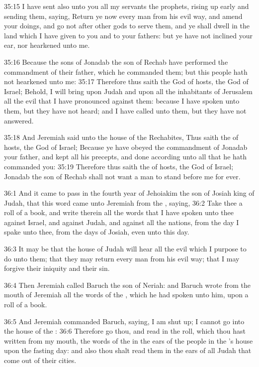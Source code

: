 35:15 I have sent also unto you all my servants the prophets, rising up early and sending them, saying, Return ye now every man from his evil way, and amend your doings, and go not after other gods to serve them, and ye shall dwell in the land which I have given to you and to your fathers: but ye have not inclined your ear, nor hearkened unto me.

35:16 Because the sons of Jonadab the son of Rechab have performed the commandment of their father, which he commanded them; but this people hath not hearkened unto me: 35:17 Therefore thus saith the \LORD God of hosts, the God of Israel; Behold, I will bring upon Judah and upon all the inhabitants of Jerusalem all the evil that I have pronounced against them: because I have spoken unto them, but they have not heard; and I have called unto them, but they have not answered.

35:18 And Jeremiah said unto the house of the Rechabites, Thus saith the \LORD of hosts, the God of Israel; Because ye have obeyed the commandment of Jonadab your father, and kept all his precepts, and done according unto all that he hath commanded you: 35:19 Therefore thus saith the \LORD of hosts, the God of Israel; Jonadab the son of Rechab shall not want a man to stand before me for ever.

36:1 And it came to pass in the fourth year of Jehoiakim the son of Josiah king of Judah, that this word came unto Jeremiah from the \LORD, saying, 36:2 Take thee a roll of a book, and write therein all the words that I have spoken unto thee against Israel, and against Judah, and against all the nations, from the day I spake unto thee, from the days of Josiah, even unto this day.

36:3 It may be that the house of Judah will hear all the evil which I purpose to do unto them; that they may return every man from his evil way; that I may forgive their iniquity and their sin.

36:4 Then Jeremiah called Baruch the son of Neriah: and Baruch wrote from the mouth of Jeremiah all the words of the \LORD, which he had spoken unto him, upon a roll of a book.

36:5 And Jeremiah commanded Baruch, saying, I am shut up; I cannot go into the house of the \LORD: 36:6 Therefore go thou, and read in the roll, which thou hast written from my mouth, the words of the \LORD in the ears of the people in the \LORD's house upon the fasting day: and also thou shalt read them in the ears of all Judah that come out of their cities.

